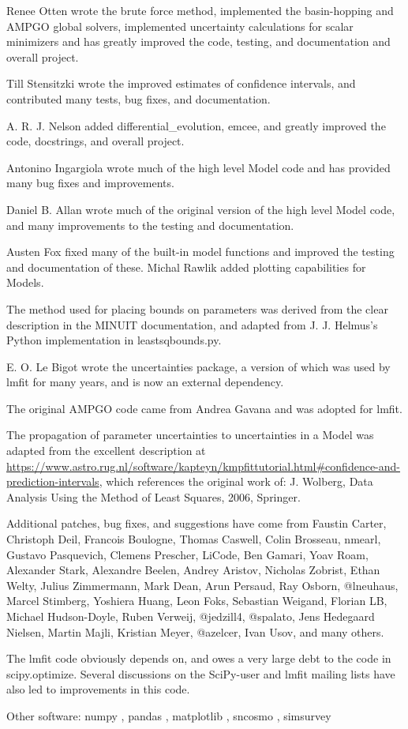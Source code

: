 \begin{acknowledgements}
 Renee Otten wrote the brute force method, implemented the basin-hopping and AMPGO global solvers, implemented uncertainty calculations for scalar minimizers and has greatly improved the code, testing, and documentation and overall project.
 
 Till Stensitzki wrote the improved estimates of confidence intervals, and contributed many tests, bug fixes, and documentation.
 
 A. R. J. Nelson added differential\_evolution, emcee, and greatly improved the code, docstrings, and overall project.
 
 Antonino Ingargiola wrote much of the high level Model code and has provided many bug fixes and improvements.
 
 Daniel B. Allan wrote much of the original version of the high level Model code, and many improvements to the testing and documentation.
 
 Austen Fox fixed many of the built-in model functions and improved the testing and documentation of these.
 Michal Rawlik added plotting capabilities for Models.

 The method used for placing bounds on parameters was derived from the clear description in the MINUIT documentation, and adapted from J. J. Helmus's Python implementation in leastsqbounds.py.

 E. O. Le Bigot wrote the uncertainties package, a version of which was used by lmfit for many years, and is now an external dependency.

 The original AMPGO code came from Andrea Gavana and was adopted for lmfit.

 The propagation of parameter uncertainties to uncertainties in a Model was adapted from the excellent description at \url{https://www.astro.rug.nl/software/kapteyn/kmpfittutorial.html\#confidence-and-prediction-intervals}, which references the original work of: J. Wolberg, Data Analysis Using the Method of Least Squares, 2006, Springer.

Additional patches, bug fixes, and suggestions have come from Faustin Carter, Christoph Deil, Francois Boulogne, Thomas Caswell, Colin Brosseau, nmearl, Gustavo Pasquevich, Clemens Prescher, LiCode, Ben Gamari, Yoav Roam, Alexander Stark, Alexandre Beelen, Andrey Aristov, Nicholas Zobrist, Ethan Welty, Julius Zimmermann, Mark Dean, Arun Persaud, Ray Osborn, @lneuhaus, Marcel Stimberg, Yoshiera Huang, Leon Foks, Sebastian Weigand, Florian LB, Michael Hudson-Doyle, Ruben Verweij, @jedzill4, @spalato, Jens Hedegaard Nielsen, Martin Majli, Kristian Meyer, @azelcer, Ivan Usov, and many others.

The lmfit code obviously depends on, and owes a very large debt to the code in scipy.optimize. Several discussions on the SciPy-user and lmfit mailing lists have also led to improvements in this code.

Other software: numpy \citep{numpy}, pandas \citep{pandas_software, pandas_paper}, matplotlib \citep{matplotlib}, sncosmo \citep{sncosmo}, simsurvey \citep{simsurvey}

\end{acknowledgements}
